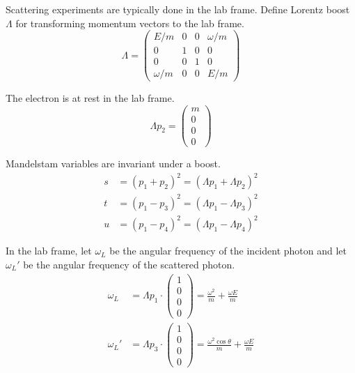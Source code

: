 Scattering experiments are typically done in the lab frame.
Define Lorentz boost $\Lambda$ for transforming momentum vectors to the lab frame.
\begin{equation*}
\Lambda=
\begin{pmatrix}
E/m & 0 & 0 & \omega/m\\
0 & 1 & 0 & 0\\
0 & 0 & 1 & 0\\
\omega/m & 0 & 0 & E/m
\end{pmatrix}
\end{equation*}

The electron is at rest in the lab frame.
\begin{equation*}
\Lambda p_2=\begin{pmatrix}m\\0\\0\\0\end{pmatrix}
\end{equation*}

Mandelstam variables are invariant under a boost.
\begin{equation*}
\begin{aligned}
s&=(p_1+p_2)^2=(\Lambda p_1+\Lambda p_2)^2
\\
t&=(p_1-p_3)^2=(\Lambda p_1-\Lambda p_3)^2
\\
u&=(p_1-p_4)^2=(\Lambda p_1-\Lambda p_4)^2
\end{aligned}
\tag{4}
\end{equation*}

In the lab frame, let $\omega_L$ be the angular frequency of the incident photon
and let $\omega_L'$ be the angular frequency of the scattered photon.
\begin{equation*}
\begin{aligned}
\omega_L&=\Lambda p_1\cdot
\begin{pmatrix}1\\0\\0\\0\end{pmatrix}
=\frac{\omega^2}{m}+\frac{\omega E}{m}
\\[1ex]
\omega_L'&=\Lambda p_3\cdot
\begin{pmatrix}1\\0\\0\\0\end{pmatrix}
=\frac{\omega^2\cos\theta}{m}+\frac{\omega E}{m}
\end{aligned}
\end{equation*}

